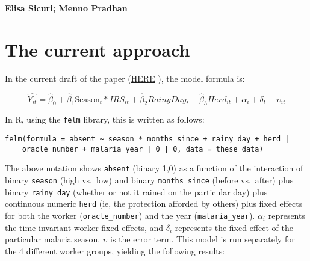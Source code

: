 \documentclass[]{article}
\begin{document}
\textbf{Elisa Sicuri; Menno Pradhan}

\vspace{3mm}

\newpage

\section{The current approach}\label{the-current-approach}

In the current draft of the paper
(\href{https://docs.google.com/document/d/1bUWRBCgVcgjSPHchIQxiTG8Vwv5hV1GLU4Tlu386sWA/edit#}{HERE}
), the model formula is:

\[
\hat{Y_{it}} = \hat{\beta}_{0} +  \hat{\beta}_{1}\text{Season}_{t} * IRS_{it} + \hat{\beta}_2{RainyDay_{t}} + \hat{\beta}_3{Herd_{it}} +  \alpha_i + \delta_t + \upsilon_{it}
\]

In R, using the \texttt{felm} library, this is written as follows:

\begin{verbatim}
felm(formula = absent ~ season * months_since + rainy_day + herd | 
    oracle_number + malaria_year | 0 | 0, data = these_data)
\end{verbatim}

The above notation shows \texttt{absent} (binary 1,0) as a function of
the interaction of binary \texttt{season} (high vs.~low) and binary
\texttt{months\_since} (before vs.~after) plus binary
\texttt{rainy\_day} (whether or not it rained on the particular day)
plus continuous numeric \texttt{herd} (ie, the protection afforded by
others) plus fixed effects for both the worker (\texttt{oracle\_number})
and the year (\texttt{malaria\_year}). \(\alpha_i\) represents the time
invariant worker fixed effects, and \(\delta_i\) represents the fixed
effect of the particular malaria season. \(\upsilon\) is the error term.
This model is run separately for the 4 different worker groups, yielding
the following results:
\end{document}
